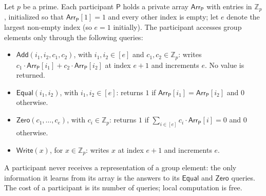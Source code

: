 \documentclass{aicr-conjecture}
\newcommand{\Zp}{\mathbb{Z}_{p}}
\newcommand{\Add}{\mathsf{Add}}
\newcommand{\Zero}{\mathsf{Zero}}
\newcommand{\Equal}{\mathsf{Equal}}
\newcommand{\WriteQ}{\mathsf{Write}}
\newcommand{\Arr}{\mathsf{Arr}}
\newcommand{\Pty}{\mathsf{P}}
\begin{document}
\begin{definition}\label{def:mggm}
Let $p$ be a prime. Each participant $\Pty$ holds a private array
$\Arr_{\Pty}$ with entries in $\Zp$, initialized so that
$\Arr_{\Pty}[1] = 1$ and every other index is empty; let $e$ denote the
largest non-empty index (so $e = 1$ initially). The participant accesses
group elements only through the following queries:
\begin{itemize}
  \item $\Add(i_{1}, i_{2}, c_{1}, c_{2})$, with $i_{1}, i_{2} \in [e]$
    and $c_{1}, c_{2} \in \Zp$: writes
    $c_{1} \cdot \Arr_{\Pty}[i_{1}] + c_{2} \cdot \Arr_{\Pty}[i_{2}]$ at
    index $e+1$ and increments $e$. No value is returned.
  \item $\Equal(i_{1}, i_{2})$, with $i_{1}, i_{2} \in [e]$: returns $1$
    if $\Arr_{\Pty}[i_{1}] = \Arr_{\Pty}[i_{2}]$ and $0$ otherwise.
  \item $\Zero(c_{1},\dots,c_{e})$, with $c_{i} \in \Zp$: returns $1$ if
    $\sum_{i \in [e]} c_{i} \cdot \Arr_{\Pty}[i] = 0$ and $0$ otherwise.
  \item $\WriteQ(x)$, for $x \in \Zp$: writes $x$ at index $e+1$ and
    increments $e$.
\end{itemize}
A participant never receives a representation of a group element: the
only information it learns from its array is the answers to its $\Equal$
and $\Zero$ queries. The cost of a participant is its number of queries;
local computation is free.
\end{definition}
\end{document}
